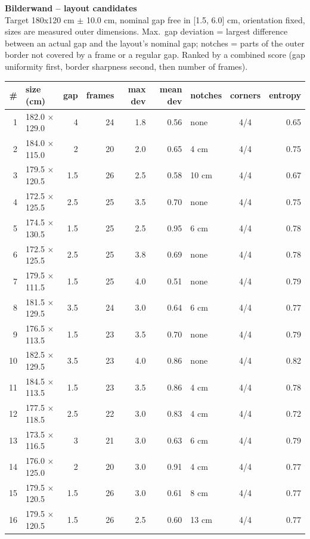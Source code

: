 \documentclass[a4paper,landscape,10pt]{article}
\begin{document}
{\LARGE\bfseries Bilderwand -- layout candidates}\\[4pt]
{\small Target 180x120 cm $\pm$ 10.0 cm, nominal gap free in
[1.5, 6.0] cm, orientation fixed, sizes are measured outer dimensions.
Max.\ gap deviation = largest difference between an actual gap and the layout's nominal gap;
notches = parts of the outer border not covered by a frame or a regular gap. Ranked by a combined
score (gap uniformity first, border sharpness second, then number of frames).}\\[10pt]
\begin{minipage}[t]{0.6\textwidth}\vspace{0pt}
\begin{tabular}{@{}r l r r r r l c r@{}}
\toprule
\# & size (cm) & gap & frames & max dev & mean dev & notches & corners & entropy \\
\midrule
1 & 182.0 $\times$ 129.0 & 4 & 24 & 1.8 & 0.56 & none & 4/4 & 0.65 \\
2 & 184.0 $\times$ 115.0 & 2 & 20 & 2.0 & 0.65 & 4 cm & 4/4 & 0.75 \\
3 & 179.5 $\times$ 120.5 & 1.5 & 26 & 2.5 & 0.58 & 10 cm & 4/4 & 0.67 \\
4 & 172.5 $\times$ 125.5 & 2.5 & 25 & 3.5 & 0.70 & none & 4/4 & 0.75 \\
5 & 174.5 $\times$ 130.5 & 1.5 & 25 & 2.5 & 0.95 & 6 cm & 4/4 & 0.78 \\
6 & 172.5 $\times$ 125.5 & 2.5 & 25 & 3.8 & 0.69 & none & 4/4 & 0.78 \\
7 & 179.5 $\times$ 111.5 & 1.5 & 25 & 4.0 & 0.51 & none & 4/4 & 0.79 \\
8 & 181.5 $\times$ 129.5 & 3.5 & 24 & 3.0 & 0.64 & 6 cm & 4/4 & 0.77 \\
9 & 176.5 $\times$ 113.5 & 1.5 & 23 & 3.5 & 0.70 & none & 4/4 & 0.79 \\
10 & 182.5 $\times$ 129.5 & 3.5 & 23 & 4.0 & 0.86 & none & 4/4 & 0.82 \\
11 & 184.5 $\times$ 113.5 & 1.5 & 23 & 3.5 & 0.86 & 4 cm & 4/4 & 0.78 \\
12 & 177.5 $\times$ 118.5 & 2.5 & 22 & 3.0 & 0.83 & 4 cm & 4/4 & 0.72 \\
13 & 173.5 $\times$ 116.5 & 3 & 21 & 3.0 & 0.63 & 6 cm & 4/4 & 0.79 \\
14 & 176.0 $\times$ 125.0 & 2 & 20 & 3.0 & 0.91 & 4 cm & 4/4 & 0.77 \\
15 & 179.5 $\times$ 120.5 & 1.5 & 26 & 3.0 & 0.61 & 8 cm & 4/4 & 0.77 \\
16 & 179.5 $\times$ 120.5 & 1.5 & 26 & 2.5 & 0.60 & 13 cm & 4/4 & 0.77 \\
\bottomrule
\end{tabular}
\end{minipage}\hfill
\end{document}
